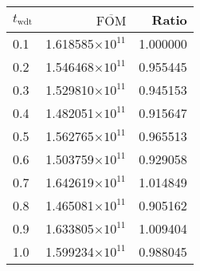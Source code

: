 \begin{tabular}{lrr}
\toprule
$t_{\mathrm{wdt}}$ & $\overline{\mathrm{FOM}}$ &    Ratio \\
\midrule
               0.1 &  1.618585$\times 10^{11}$ & 1.000000 \\
               0.2 &  1.546468$\times 10^{11}$ & 0.955445 \\
               0.3 &  1.529810$\times 10^{11}$ & 0.945153 \\
               0.4 &  1.482051$\times 10^{11}$ & 0.915647 \\
               0.5 &  1.562765$\times 10^{11}$ & 0.965513 \\
               0.6 &  1.503759$\times 10^{11}$ & 0.929058 \\
               0.7 &  1.642619$\times 10^{11}$ & 1.014849 \\
               0.8 &  1.465081$\times 10^{11}$ & 0.905162 \\
               0.9 &  1.633805$\times 10^{11}$ & 1.009404 \\
               1.0 &  1.599234$\times 10^{11}$ & 0.988045 \\
\bottomrule
\end{tabular}
